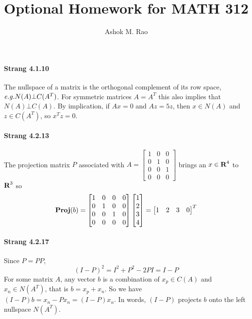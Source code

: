 \documentclass[10pt]{article}
\title{Optional Homework for MATH 312}
\author{Ashok M. Rao}
\newcommand{\reals}{{\mbox{\bf R}}}
\newcommand{\proj}{\mathop{\bf Proj}}
\newcommand{\eg}{{\it e.g.}}
\begin{document}
\maketitle
{}

\paragraph{Strang 4.1.10} The nullspace of a matrix is the orthogonal complement of its row space, $\eg N(A) \bot C(A^T)$. For symmetric matrices $A = A^{T}$ this also implies that $N(A) \bot C(A)$. By implication, if $Ax = 0$ and $Az = 5z$, then $x\in N(A)$ and $z\in C(A^T)$, so $x^T z = 0$.

\paragraph{Strang 4.2.13} The projection matrix $P$ associated with $A = \begin{bmatrix}1& 0& 0\\0& 1& 0\\0& 0& 1\\0& 0& 0\end{bmatrix}$ brings an $x\in \reals^4$ to $\reals^3$ so
\[\proj (b) = \begin{bmatrix}1& 0& 0& 0\\0& 1& 0& 0\\0& 0& 1& 0\\0& 0& 0& 0\end{bmatrix}\begin{bmatrix}1\\2\\3\\4\end{bmatrix} = \begin{bmatrix}1& 2& 3& 0\end{bmatrix}^T\]

\paragraph{Strang 4.2.17} Since $P = PP$,
\[(I - P)^2 = I^2 + P^2 - 2PI = I-P\]
For some matrix $A$, any vector $b$ is a combination of $x_p\in C(A)$ and $x_n\in N(A^T)$, that is $b = x_p + x_n$. So we have $(I-P)b = x_n - P x_n = (I-P) x_n$. In words, $(I-P)$ projects $b$ onto the left nullspace $N(A^T)$.
\end{document}
